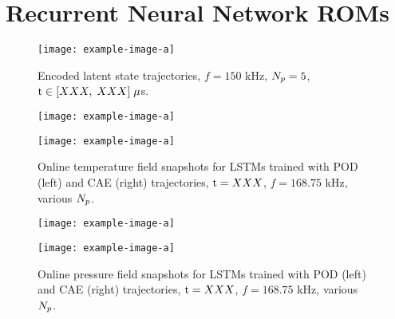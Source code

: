 \section{Recurrent Neural Network ROMs}

\begin{figure}
    \centering
    \texttt{[image: example-image-a]}
    \caption{Encoded latent state trajectories, $f = 150$ kHz, $N_p = 5$, $\text{t} \in [XXX, \; XXX] \; \mu$s.}
\end{figure}

\begin{figure}
    \begin{minipage}{0.49\linewidth}
        \texttt{[image: example-image-a]}
    \end{minipage}
    \begin{minipage}{0.49\linewidth}
        \texttt{[image: example-image-a]}
    \end{minipage}
    \caption{Online temperature field snapshots for LSTMs trained with POD (left) and CAE (right) trajectories, $\text{t} = XXX$, $f = 168.75$ kHz, various $N_p$.}
\end{figure}

\begin{figure}
    \begin{minipage}{0.49\linewidth}
        \texttt{[image: example-image-a]}
    \end{minipage}
    \begin{minipage}{0.49\linewidth}
        \texttt{[image: example-image-a]}
    \end{minipage}
    \caption{Online pressure field snapshots for LSTMs trained with POD (left) and CAE (right) trajectories, $\text{t} = XXX$, $f = 168.75$ kHz, various $N_p$.}
\end{figure}